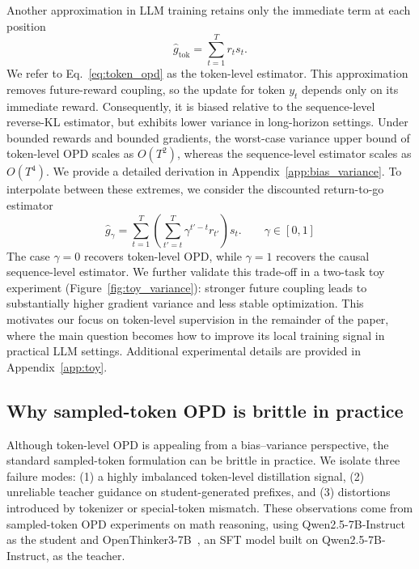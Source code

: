 \documentclass{article}
\begin{document}
Another approximation in LLM training retains only the immediate term at each position
\begin{equation}
\hat g_{\mathrm{tok}} = \sum_{t=1}^{T} r_t s_t.
\label{eq:token_opd}
\end{equation}
We refer to Eq.~\eqref{eq:token_opd} as the token-level estimator.
This approximation removes future-reward coupling, so the update for token $y_t$ depends only on its immediate reward. Consequently, it is biased relative to the sequence-level reverse-KL estimator, but exhibits lower variance in long-horizon settings.
Under bounded rewards and bounded gradients, the worst-case variance upper bound of token-level OPD scales as $O(T^2)$, whereas the sequence-level estimator scales as $O(T^4)$. We provide a detailed derivation in Appendix~\ref{app:bias_variance}. To interpolate between these extremes, we consider the discounted return-to-go estimator
\begin{equation}
\hat g_{\gamma}
=
\sum_{t=1}^{T}
\left(\sum_{t'=t}^{T} \gamma^{t'-t} r_{t'} \right) s_t.
\qquad
\gamma \in [0,1]
\label{eq:gamma_estimator}
\end{equation}
The case $\gamma=0$ recovers token-level OPD, while $\gamma=1$ recovers the causal sequence-level estimator. We further validate this trade-off in a two-task toy experiment (Figure~\ref{fig:toy_variance}): stronger future coupling leads to substantially higher gradient variance and less stable optimization. This motivates our focus on token-level supervision in the remainder of the paper, where the main question becomes how to improve its local training signal in practical LLM settings. Additional experimental details are provided in Appendix~\ref{app:toy}.



\subsection{Why sampled-token OPD is brittle in practice}
\label{subsec:brittle}

Although token-level OPD is appealing from a bias--variance perspective, the standard sampled-token formulation can be brittle in practice. We isolate three failure modes: (1) a highly imbalanced token-level distillation signal, (2) unreliable teacher guidance on student-generated prefixes, and (3) distortions introduced by tokenizer or special-token mismatch.
These observations come from sampled-token OPD experiments on math reasoning, using Qwen2.5-7B-Instruct~\citep{qwen2025qwen25} as the student and OpenThinker3-7B~\citep{openthoughts2025}, an SFT model built on Qwen2.5-7B-Instruct, as the teacher.
\end{document}
